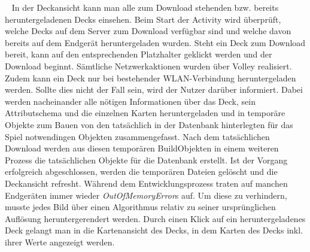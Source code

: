 \documentclass{scrartcl}
\begin{document}
\ \newline
In der Deckansicht kann man alle zum Download stehenden bzw. bereits heruntergeladenen Decks einsehen. Beim Start der Activity wird überprüft, welche Decks auf dem Server zum Download verfügbar sind und welche davon bereits auf dem Endgerät heruntergeladen wurden.
Steht ein Deck zum Download bereit, kann auf den entsprechenden Platzhalter geklickt werden und der Download beginnt. Sämtliche Netzwerkaktionen wurden über Volley realisiert. Zudem kann ein Deck nur bei bestehender WLAN-Verbindung heruntergeladen werden. Sollte dies nicht der Fall sein, wird der Nutzer darüber informiert. Dabei werden nacheinander alle nötigen Informationen über das Deck, sein Attributschema und die
einzelnen Karten heruntergeladen und in temporäre Objekte zum Bauen von den tatsächlich in der Datenbank hinterlegten für das Spiel notwendingen Objekten zusammengefasst. Nach dem tatsächlichen Download werden aus diesen temporären BuildObjekten in einem weiteren Prozess die 
tatsächlichen Objekte für die Datenbank erstellt. Ist der Vorgang erfolgreich abgeschlossen, werden die temporären Dateien gelöscht und die Deckansicht refresht.
Während dem Entwicklungsprozess traten auf manchen Endgeräten immer wieder \textit{OutOfMemoryError}s auf. Um diese zu verhindern, musste jedes Bild über einen Algorithmus relativ zu seiner ursprünglichen Auflösung heruntergerendert werden.
Durch einen Klick auf ein heruntergeladenes Deck gelangt man in die Kartenansicht des Decks, in dem Karten des Decks inkl. ihrer Werte angezeigt werden.
\end{document}
